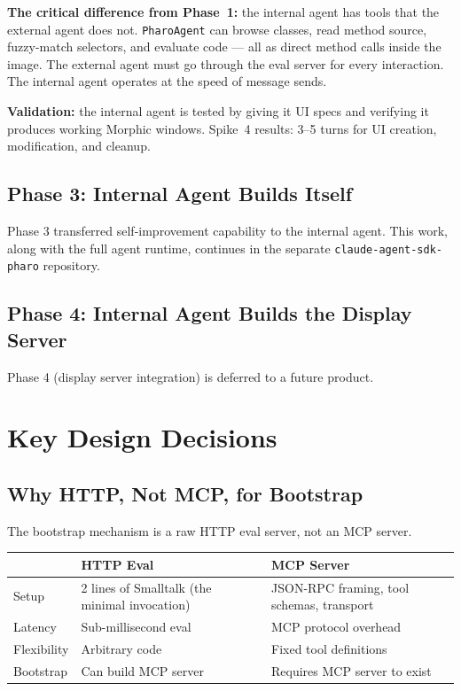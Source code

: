 \documentclass[a4paper,10pt,fleqn]{article}
\newcommand{\cls}[1]{\texttt{#1}}
\begin{document}
\textbf{The critical difference from Phase~1:} the internal agent has
tools that the external agent does not.  \cls{PharoAgent} can browse
classes, read method source, fuzzy-match selectors, and evaluate code
--- all as direct method calls inside the image.  The external agent
must go through the eval server for every interaction.  The internal
agent operates at the speed of message sends.

\textbf{Validation:} the internal agent is tested by giving it UI
specs and verifying it produces working Morphic windows.  Spike~4
results: 3--5 turns for UI creation, modification, and cleanup.

\subsection{Phase 3: Internal Agent Builds Itself}

Phase 3 transferred self-improvement capability to the internal agent.
This work, along with the full agent runtime, continues in the separate
\texttt{claude-agent-sdk-pharo} repository.

\subsection{Phase 4: Internal Agent Builds the Display Server}

Phase 4 (display server integration) is deferred to a future product.

\section{Key Design Decisions}

\subsection{Why HTTP, Not MCP, for Bootstrap}

The bootstrap mechanism is a raw HTTP eval server, not an MCP server.

\begin{center}
\begin{tabularx}{\linewidth}{@{}lYY@{}}
\toprule
& \textbf{HTTP Eval} & \textbf{MCP Server} \\
\midrule
Setup       & 2 lines of Smalltalk (the minimal invocation) & JSON-RPC framing, tool schemas, transport \\
Latency     & Sub-millisecond eval & MCP protocol overhead \\
Flexibility & Arbitrary code       & Fixed tool definitions \\
Bootstrap   & Can build MCP server & Requires MCP server to exist \\
\bottomrule
\end{tabularx}
\end{center}
\end{document}
